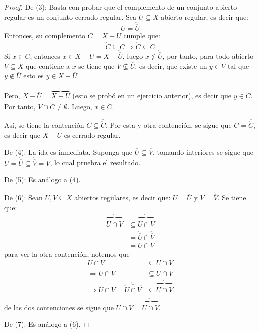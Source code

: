 \documentclass[12pt]{report}
\theoremstyle{largebreak}
\newcommand{\Int}[1]{\ensuremath{\mathring{#1}}}
\newcommand{\Cls}[1]{\ensuremath{\overline{#1}}}
\begin{document}
\begin{proof}
        De (3): Basta con probar que el complemento de un conjunto abierto regular es un conjunto cerrado regular. Sea $U\subseteq X$ abierto regular, es decir que:
        \begin{equation*}
            U=\Int{\Cls{U}}
        \end{equation*}
        Entonces, su complemento $C=X-U$ cumple que:
        \begin{equation*}
            \Int{C}\subseteq C
            \Rightarrow \Cls{\Int{C}}\subseteq C
        \end{equation*}
        Si $x\in C$, entonces $x\in X-U=X-\Int{\Cls{U}}$, luego $x\notin\Int{\Cls{U}}$, por tanto, para todo abierto $V\subseteq X$ que contiene a $x$ se tiene que $V\nsubseteq\Cls{U}$, es decir, que existe un $y\in V$ tal que $y\notin \Cls{U}$ esto es $y\in X-\Cls{U}$.

        Pero, $X-\Cls{U}=\Int{\overbrace{X-U}}$ (esto se probó en un ejercicio anterior), es decir que $y\in\Int{C}$. Por tanto, $V\cap\Int{C}\neq\emptyset$. Luego, $x\in \Cls{\Int{C}}$.

        Así, se tiene la contención $C\subseteq\Cls{\Int{C}}$. Por esta y otra contención, se sigue que $C=\Cls{\Int{C}}$, es decir que $X-U$ es cerrado regular.

        De (4): La ida es inmediata. Suponga que $\Cls{U}\subseteq\Cls{V}$, tomando interiores se sigue que $U=\Int{\Cls{U}}\subseteq\Int{\Cls{V}}=V$, lo cual pruebra el resultado.

        De (5): Es análogo a (4).

        De (6): Sean $U,V\subseteq X$ abiertos regulares, es decir que: $U=\Int{\Cls{U}}$ y $V=\Int{\Cls{V}}$. Se tiene que:
        \begin{equation*}
            \begin{split}
                \Int{\overbrace{\Cls{U\cap V}}}&\subseteq\Int{\overbrace{\Cls{U}\cap\Cls{V}}}\\
                &=\Int{\Cls{U}}\cap\Int{\Cls{V}}\\
                &=U\cap V
            \end{split}
        \end{equation*}
        para ver la otra contención, notemos que
        \begin{equation*}
            \begin{split}
                U\cap V&\subseteq U\cap V\\
                \Rightarrow U\cap V&\subseteq \Cls{U\cap V}\\
                \Rightarrow U\cap V=\Int{\overbrace{U\cap V}} &\subseteq \Int{\overbrace{\Cls{U\cap V}}}\\
            \end{split}
        \end{equation*}
        de las dos contenciones se sigue que $U\cap V = \Int{\overbrace{\Cls{U\cap V}}}$.

        De (7): Es análogo a (6).
    \end{proof}
\end{document}
